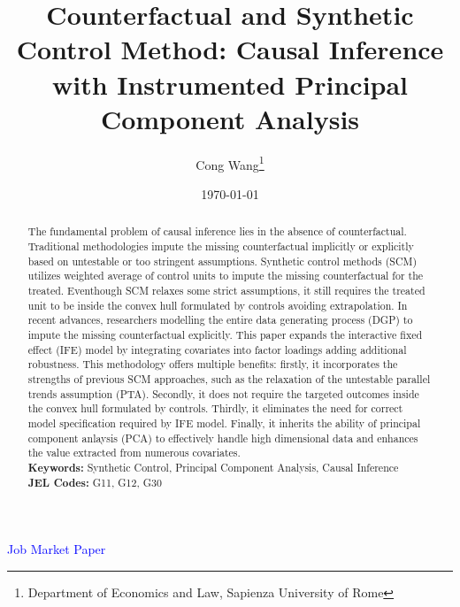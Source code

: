 \documentclass[12pt]{article}
\begin{document}
\newtheorem{assumption}{Assumption}

\begin{titlepage}
\title{Counterfactual and Synthetic Control Method: Causal Inference with Instrumented Principal Component Analysis}
\author{ Cong Wang\thanks{Department of Economics and Law, Sapienza University of Rome}}
\date{\today}
\maketitle
\begin{center}
\textcolor{blue}{Job Market Paper}
\end{center}
\begin{abstract}
\noindent The fundamental problem of causal inference lies in the absence of counterfactual. Traditional methodologies impute the missing counterfactual implicitly or explicitly based on untestable or too stringent assumptions. Synthetic control methods (SCM) utilizes weighted average of control units to impute the missing counterfactual for the treated. Eventhough SCM relaxes some strict assumptions, it still requires the treated unit to be inside the convex hull formulated by controls avoiding extrapolation. In recent advances, researchers modelling the entire data generating process (DGP) to impute the missing counterfactual explicitly. This paper expands the interactive fixed effect (IFE) model by integrating covariates into factor loadings adding additional robustness. This methodology offers multiple benefits: firstly, it incorporates the strengths of previous SCM approaches, such as the relaxation of the untestable parallel trends assumption (PTA). Secondly, it does not require the targeted outcomes inside the convex hull formulated by controls. Thirdly, it eliminates the need for correct model specification required by IFE model. Finally, it inherits the ability of principal component anlaysis (PCA) to effectively handle high dimensional data and enhances the value extracted from numerous covariates.\\

\noindent\textbf{Keywords:} Synthetic Control, Principal Component Analysis, Causal Inference\\

\noindent\textbf{JEL Codes:} G11, G12, G30\\
\bigskip
\end{abstract}
\setcounter{page}{0}
\thispagestyle{empty}
\end{titlepage}
\pagebreak \newpage
\end{document}
